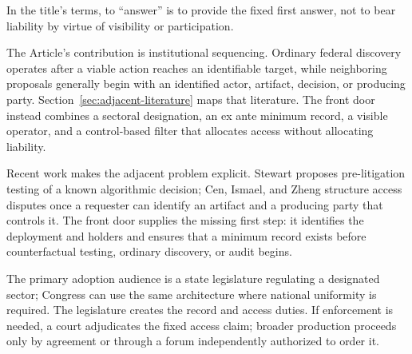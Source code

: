 In the title's terms, to ``answer'' is to provide the fixed first answer, not to bear liability by virtue of visibility or participation.

The Article's contribution is institutional sequencing. Ordinary federal discovery operates after a viable action reaches an identifiable target, while neighboring proposals generally begin with an identified actor, artifact, decision, or producing party. Section~\ref{sec:adjacent-literature} maps that literature. The front door instead combines a sectoral designation, an ex ante minimum record, a visible operator, and a control-based filter that allocates access without allocating liability.

Recent work makes the adjacent problem explicit. Stewart proposes pre-litigation testing of a known algorithmic decision; Cen, Ismael, and Zheng structure access disputes once a requester can identify an artifact and a producing party that controls it. The front door supplies the missing first step: it identifies the deployment and holders and ensures that a minimum record exists before counterfactual testing, ordinary discovery, or audit begins.

The primary adoption audience is a state legislature regulating a designated sector; Congress can use the same architecture where national uniformity is required. The legislature creates the record and access duties. If enforcement is needed, a court adjudicates the fixed access claim; broader production proceeds only by agreement or through a forum independently authorized to order it.

